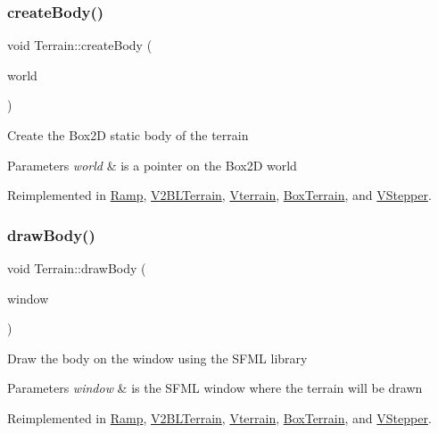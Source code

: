 \subsubsection{\texorpdfstring{create\+Body()}{createBody()}}
{\footnotesize\ttfamily void Terrain\+::create\+Body (\begin{DoxyParamCaption}\item[{b2\+World $\ast$}]{world }\end{DoxyParamCaption})\hspace{0.3cm}{\ttfamily [virtual]}}

Create the Box2D static body of the terrain 
\begin{DoxyParams}{Parameters}
{\em world} & is a pointer on the Box2D world \\
\hline
\end{DoxyParams}


Reimplemented in \mbox{\hyperlink{class_ramp_a12049389b07cc2bff4932004c8357dd2}{Ramp}}, \mbox{\hyperlink{class_v2_b_l_terrain_a51b40b5e3f6ee5ec1281baa7f7c076f9}{V2\+B\+L\+Terrain}}, \mbox{\hyperlink{class_vterrain_a5c46826f82f94442e3a2fb8f277bfb37}{Vterrain}}, \mbox{\hyperlink{class_box_terrain_a7f5172beaa4e5dcb4d45f3c5e46e3155}{Box\+Terrain}}, and \mbox{\hyperlink{class_v_stepper_a3d7c63308277488473edf5326491d7ee}{V\+Stepper}}.

\mbox{\label{class_terrain_ae60571b91c1979fa94bdfc5002da6ac7}} 
\subsubsection{\texorpdfstring{draw\+Body()}{drawBody()}}
{\footnotesize\ttfamily void Terrain\+::draw\+Body (\begin{DoxyParamCaption}\item[{sf\+::\+Render\+Window \&}]{window }\end{DoxyParamCaption})\hspace{0.3cm}{\ttfamily [virtual]}}

Draw the body on the window using the S\+F\+ML library 
\begin{DoxyParams}{Parameters}
{\em window} & is the S\+F\+ML window where the terrain will be drawn \\
\hline
\end{DoxyParams}


Reimplemented in \mbox{\hyperlink{class_ramp_ab05c0a8c5706488be4aba9c4f52f55c9}{Ramp}}, \mbox{\hyperlink{class_v2_b_l_terrain_aea63be5e3b6d05da4c3b5ce954429a4b}{V2\+B\+L\+Terrain}}, \mbox{\hyperlink{class_vterrain_a4be34646206e14fe5f5aa3d39761e3fe}{Vterrain}}, \mbox{\hyperlink{class_box_terrain_a309e67722a008ef166198d36add1690a}{Box\+Terrain}}, and \mbox{\hyperlink{class_v_stepper_ad81367e4f7422afcd460fd0094a25bc3}{V\+Stepper}}.

